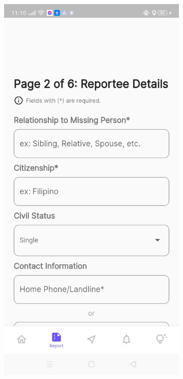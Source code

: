 \begin{figure}[!h]
\begin{subfigure}[c]{0.30\linewidth}
        \includegraphics[scale=0.15]{figures/Chapter4/Main/p2-1.jpg}
    \end{subfigure}
    \centering
    \begin{subfigure}[c]{0.30\linewidth}

\end{subfigure}
\end{figure}
